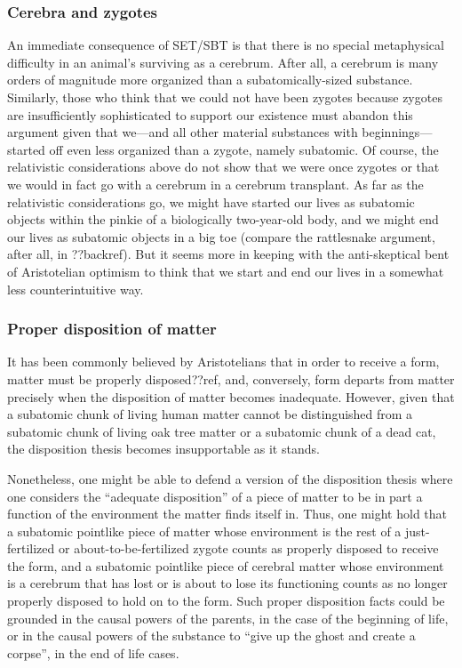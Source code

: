 \subsubsection{Cerebra and zygotes}
An immediate consequence of SET/SBT is that there is no special metaphysical difficulty in an animal's 
surviving as a cerebrum. After all, a cerebrum is many orders of magnitude more organized than a subatomically-sized
substance. Similarly, those who think that we could not have been zygotes because zygotes are insufficiently sophisticated
to support our existence must abandon this argument given that we---and all other material substances with beginnings---started
off even less organized than a zygote, namely subatomic. Of course, the relativistic considerations above do not 
show that we were once zygotes or that we would in fact go with a cerebrum in a cerebrum transplant. As far as the relativistic 
considerations go, we might have started our lives as subatomic objects within the pinkie of a biologically two-year-old 
body, and we might end our lives as subatomic objects in a big toe (compare the rattlesnake argument, after all, in ??backref).
But it seems more in keeping with the anti-skeptical bent of Aristotelian optimism to think that we start and end our lives 
in a somewhat less counterintuitive way.

\subsubsection{Proper disposition of matter}\label{sec:disposition}
It has been commonly believed by Aristotelians that in order to receive a form, matter must be properly disposed??ref, and,
conversely, form departs from matter precisely when the disposition of matter becomes inadequate. However, given that a subatomic chunk of living human matter cannot be distinguished from a subatomic chunk of living oak tree matter or a subatomic chunk of a dead cat, the disposition thesis becomes insupportable as it stands. 

Nonetheless, one might be able to defend a version of the disposition thesis where one considers the ``adequate disposition'' of 
a piece of matter to be in part a function of the environment the matter finds itself in. Thus, one might hold that a subatomic
pointlike piece of matter whose environment is the rest of a just-fertilized or about-to-be-fertilized zygote counts as 
properly disposed to receive the form, and a subatomic pointlike piece of cerebral matter whose environment is a cerebrum that 
has lost or is about to lose its functioning counts as no longer properly disposed to hold on to the form. Such proper
disposition facts could be grounded in the causal powers of the parents, in the case of the beginning of life, or in the causal 
powers of the substance to ``give up the ghost and create a corpse'', in the end of life cases. 


